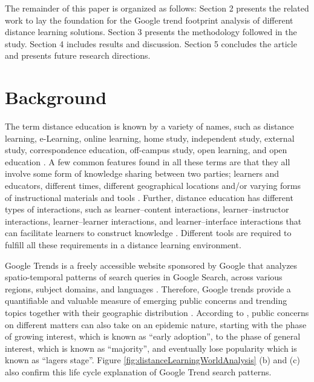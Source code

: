 \documentclass[11pt,a4paper,]{article}
\begin{document}
The remainder of this paper is organized as follows: Section 2 presents the related work to lay the foundation for the Google trend footprint analysis of different distance learning solutions. Section 3 presents the methodology followed in the study. Section 4 includes results and discussion. Section 5 concludes the article and presents future research directions.

\hypertarget{background}{%
\section{Background}\label{background}}

The term distance education is known by a variety of names, such as distance learning, e-Learning, online learning, home study, independent study, external study, correspondence education, off-campus study, open learning, and open education \autocite{moore2011learning}. A few common features found in all these terms are that they all involve some form of knowledge sharing between two parties; learners and educators, different times, different geographical locations and/or varying forms of instructional materials and tools \autocite{moore2011learning}. Further, distance education has different types of interactions, such as learner--content interactions, learner--instructor interactions, learner--learner interactions, and learner--interface interactions that can facilitate learners to construct knowledge \autocite{wallace2003online}. Different tools are required to fulfill all these requirements in a distance learning environment.

Google Trends is a freely accessible website sponsored by Google that analyzes spatio-temporal patterns of search queries in Google Search, across various regions, subject domains, and languages \autocite{carneiro2009google}. Therefore, Google trends provide a quantifiable and valuable measure of emerging public concerns and trending topics together with their geographic distribution \autocite{alicino2015assessing,cook2011assessing}. According to \textcite{jarynowski2020perception}, public concerns on different matters can also take on an epidemic nature, starting with the phase of growing interest, which is known as ``early adoption'', to the phase of general interest, which is known as ``majority'', and eventually lose popularity which is known as ``lagers stage''. Figure \ref{fig:distanceLearningWorldAnalysis} (b) and (c) also confirm this life cycle explanation of Google Trend search patterns.
\end{document}

